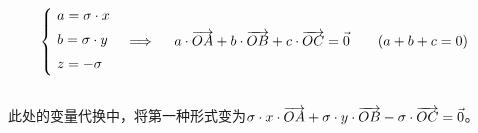 \documentclass[UTF8]{ctexart}
\let\nvec\vec
\def\vec#1{\nvec{\vphantom b\smash{#1}}}
\begin{document}
    \begin{align}
        &\begin{cases}
            ~a=\sigma\cdot x\\[1mm]
            ~b=\sigma\cdot y\\[1mm]
            ~z=-\sigma\\[1mm]
        \end{cases}\Longrightarrow~~~~a\cdot\overrightarrow{OA}+b\cdot\overrightarrow{OB}+c\cdot\overrightarrow{OC}=\vec{0}~~~~~~(a+b+c=0)
    \end{align}\\
    此处的变量代换中，将第一种形式变为$\sigma\cdot x\cdot\overrightarrow{OA} +\sigma\cdot y\cdot\overrightarrow{OB}-\sigma\cdot\overrightarrow{OC}=\vec{0}$。

\newpage
\end{document}
